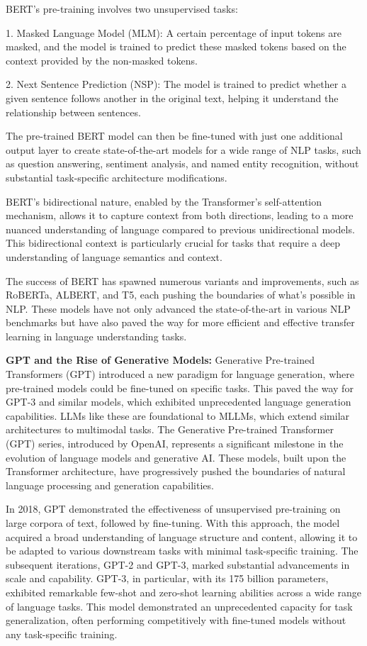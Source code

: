 BERT's pre-training involves two unsupervised tasks:

1. Masked Language Model (MLM): A certain percentage of input tokens are masked, and the model is trained to predict these masked tokens based on the context provided by the non-masked tokens.

2. Next Sentence Prediction (NSP): The model is trained to predict whether a given sentence follows another in the original text, helping it understand the relationship between sentences.

The pre-trained BERT model can then be fine-tuned with just one additional output layer to create state-of-the-art models for a wide range of NLP tasks, such as question answering, sentiment analysis, and named entity recognition, without substantial task-specific architecture modifications.

BERT's bidirectional nature, enabled by the Transformer's self-attention mechanism, allows it to capture context from both directions, leading to a more nuanced understanding of language compared to previous unidirectional models. This bidirectional context is particularly crucial for tasks that require a deep understanding of language semantics and context.

The success of BERT has spawned numerous variants and improvements, such as RoBERTa, ALBERT, and T5, each pushing the boundaries of what's possible in NLP. These models have not only advanced the state-of-the-art in various NLP benchmarks but have also paved the way for more efficient and effective transfer learning in language understanding tasks.


\textbf{GPT and the Rise of Generative Models:} Generative Pre-trained Transformers (GPT) introduced a new paradigm for language generation, where pre-trained models could be fine-tuned on specific tasks. This paved the way for GPT-3 and similar models, which exhibited unprecedented language generation capabilities. LLMs like these are foundational to MLLMs, which extend similar architectures to multimodal tasks. The Generative Pre-trained Transformer (GPT) series, introduced by OpenAI, represents a significant milestone in the evolution of language models and generative AI. These models, built upon the Transformer architecture, have progressively pushed the boundaries of natural language processing and generation capabilities.

In 2018, GPT demonstrated the effectiveness of unsupervised pre-training on large corpora of text, followed by fine-tuning. With this approach, the model acquired a broad understanding of language structure and content, allowing it to be adapted to various downstream tasks with minimal task-specific training. The subsequent iterations, GPT-2 and GPT-3, marked substantial advancements in scale and capability. GPT-3, in particular, with its 175 billion parameters, exhibited remarkable few-shot and zero-shot learning abilities across a wide range of language tasks. This model demonstrated an unprecedented capacity for task generalization, often performing competitively with fine-tuned models without any task-specific training.

